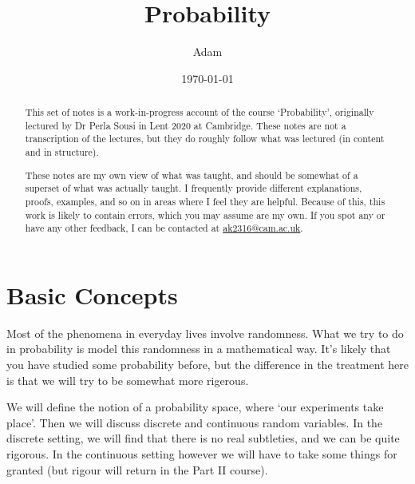 \documentclass[a4paper]{scrreprt}
\title{Probability}
\author{Adam}
\date{\today}
\begin{document}
\maketitle

\begin{abstract}
	

	This set of notes is a work-in-progress account of the course `Probability', originally lectured by Dr Perla Sousi in Lent 2020 at Cambridge. These notes are not a transcription of the lectures, but they do roughly follow what was lectured (in content and in structure).

	These notes are my own view of what was taught, and should be somewhat of a superset of what was actually taught. I frequently provide different explanations, proofs, examples, and so on in areas where I feel they are helpful. Because of this, this work is likely to contain errors, which you may assume are my own. If you spot any or have any other feedback, I can be contacted at \href{mailto:ak2316@cam.ac.uk}{ak2316@cam.ac.uk}.



\end{abstract}

\tableofcontents

\clearpage

\chapter{Basic Concepts}

Most of the phenomena in everyday lives involve randomness. What we try to do in probability is model this randomness in a mathematical way. It's likely that you have studied some probability before, but the difference in the treatment here is that we will try to be somewhat more rigerous.

We will define the notion of a probability space, where `our experiments take place'. Then we will discuss discrete and continuous random variables. 
In the discrete setting, we will find that there is no real subtleties, and we can be quite rigorous. In the continuous setting however we will have to take some things for granted (but rigour will return in the Part II course).
\end{document}
